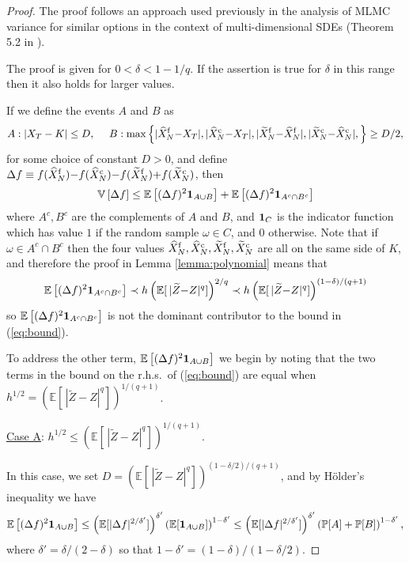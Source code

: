 \documentclass[review]{siamart190516}
\def \EE {{\mathbb{E}}}
\def \VV {{\mathbb{V}}}
\def \PP {{\mathbb{P}}}
\def \one {{\bf 1}}
\def \tZ {{\widetilde{Z}}}
\def \tXf  {{\widetilde{X}^{\rm f}}}
\def \tXc  {{\widetilde{X}^{\rm c}}}
\def \hXf {{\widehat{X}^{\rm f}}}
\def \hXc {{\widehat{X}^{\rm c}}}
\begin{document}
\begin{proof}
The proof follows an approach used previously in the analysis of MLMC variance
for similar options in the context of multi-dimensional SDEs (Theorem 5.2 in \cite{gs14}).

The proof is given for $0\!<\!\delta\!< 1{-}1/q$.  If the assertion 
is true for $\delta$ in this range then it also holds for larger values.

If we define the events $A$ and $B$ as
\[
A: | X_T - K | \leq D, ~~~~
B: \max\left\{
 |\hXf_N {-} X_T|,  |\hXc_N {-} X_T|,  |\tXf_N {-} \hXf_N|,  |\tXc_N {-} \hXc_N|, 
 \right\} \geq D/2,
\]
for some choice of constant $D\!>\!0$, and define
$\Delta f \equiv  f(\hXf_N) {-} f(\hXc_N) {-} f(\tXf_N) {+} f(\tXc_N)$, then
\[
\VV\left[ \Delta f \right] 
\leq \EE\left[ (\Delta f)^2 \one_{A\cup B} \right]
  +  \EE\left[ (\Delta f)^2 \one_{A^c\cap B^c} \right]
\]
where $A^c, B^c$ are the complements of $A$ and $B$, and $\one_C$ is the indicator function
which has value $1$ if the random sample $\omega\in C$, and 0 otherwise.
Note that if $\omega \!\in\! A^c\!\cap\! B^c$ then the four values 
$\hXf_N, \hXc_N, \tXf_N, \tXc_N$  are all on the same side of $K$, and therefore
the proof in Lemma \ref{lemma:polynomial} means that 
\begin{equation}
\EE\left[ (\Delta f)^2 \one_{A^c\cap B^c} \right]
\prec h \left(\EE[\, |\tZ{-}Z|^q]\right)^{2/q}
\prec h \left(\EE[\, |\tZ{-}Z|^q]\right)^{(1-\delta)/(q+1)}
\label{eq:bound1}
\end{equation}
so $\EE\left[ (\Delta f)^2 \one_{A^c\cap B^c} \right]$ is not the dominant
contributor to the bound in (\ref{eq:bound}).

To address the other term, $\EE\left[ (\Delta f)^2 \one_{A\cup B} \right]$
we begin by noting that the two terms in the bound on the r.h.s.~of
(\ref{eq:bound}) are equal when
$h^{1/2} = (\EE[\, |\tZ{-}Z|^q])^{1/(q+1)}$.

\vspace{0.2in}

\underline{Case A}: $h^{1/2} \leq (\EE[\, |\tZ{-}Z|^q])^{1/(q+1)}$.

In this case, we set $D\!=\!(\EE[\, |\tZ{-}Z|^q])^{(1-\delta/2)/(q+1)}$,
and by H\"older's inequality we have
\[
\EE\left[ (\Delta f)^2 \one_{A\cup B} \right]
\leq \left( \EE[ |\Delta f|^{2/\delta'}] \right)^{\delta'}
     \left( \EE[\one_{A\cup B}] \right)^{1-\delta'}
\leq \left( \EE[ |\Delta f|^{2/\delta'}] \right)^{\delta'}
     \left( \PP[A] + \PP[B] \right)^{1-\delta'},
\]
where $\delta'=\delta/(2{-}\delta)$ so that
$1{-}\delta'=(1{-}\delta)/(1{-}\delta/2)$.


\end{proof}
\end{document}

